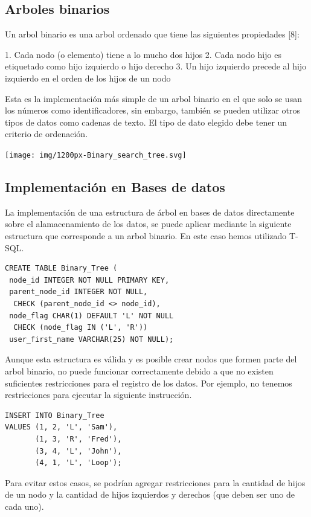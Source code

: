 \documentclass[twoside,twocolumn]{article}
\begin{document}
\subsection{Arboles binarios}
Un arbol binario es una arbol ordenado que tiene las siguientes propiedades [8]:


1. Cada nodo (o elemento) tiene a lo mucho dos hijos
2. Cada nodo hijo es etiquetado como hijo izquierdo o hijo derecho
3. Un hijo izquierdo precede al hijo izquierdo en el orden de los hijos de un nodo


Esta es la implementación más simple de un arbol binario en el que solo se usan los números como identificadores, sin embargo, también se pueden utilizar otros tipos de datos como cadenas de texto. El tipo de dato elegido debe tener un criterio de ordenación.

\texttt{[image: img/1200px-Binary\_search\_tree.svg]}

\subsection{Implementación en Bases de datos}
La implementación de una estructura de árbol en bases de datos directamente sobre el alamacenamiento de los datos, se puede aplicar mediante la siguiente estructura que corresponde a un arbol binario. En este caso hemos utilizado T-SQL.

\begin{verbatim}
CREATE TABLE Binary_Tree (
 node_id INTEGER NOT NULL PRIMARY KEY,
 parent_node_id INTEGER NOT NULL,
  CHECK (parent_node_id <> node_id),
 node_flag CHAR(1) DEFAULT 'L' NOT NULL
  CHECK (node_flag IN ('L', 'R'))
 user_first_name VARCHAR(25) NOT NULL);
\end{verbatim}

Aunque esta estructura es válida y es posible crear nodos que formen parte del arbol binario, no puede funcionar correctamente debido a que no existen suficientes restricciones para el registro de los datos. Por ejemplo, no tenemos restricciones para ejecutar la siguiente instrucción.

\begin{verbatim}
INSERT INTO Binary_Tree
VALUES (1, 2, 'L', 'Sam'),
       (1, 3, 'R', 'Fred'),
       (3, 4, 'L', 'John'),
       (4, 1, 'L', 'Loop');
\end{verbatim}

Para evitar estos casos, se podrían agregar restricciones para la cantidad de hijos de un nodo y la cantidad de hijos izquierdos y derechos (que deben ser uno de cada uno).
\end{document}
